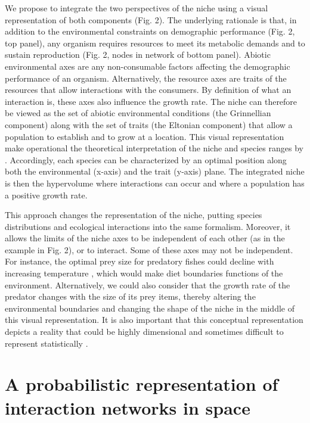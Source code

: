 \documentclass[12pt]{article}
\begin{document}
We propose to integrate the two perspectives of the niche using a visual
representation of both components (Fig. 2). The underlying rationale is that,
in addition to the environmental constraints on demographic performance (Fig. 2,
top panel), any organism requires resources to meet its metabolic demands and
to sustain reproduction (Fig. 2, nodes in network of bottom panel). Abiotic
environmental axes are any non-consumable factors affecting the demographic
performance of an organism. Alternatively, the resource axes are traits of the
resources that allow interactions with the consumers. By definition of what an
interaction is, these axes also influence the growth rate. The niche can
therefore be viewed as the set of abiotic environmental conditions (the
Grinnellian component) along with the set of traits (the Eltonian component)
that allow a population to establish and to grow at a location. This visual
representation make operational the theoretical interpretation of the niche
and species ranges by \citet{Godsoe2017}. Accordingly, each
species can be characterized by an optimal position along both the
environmental (x-axis) and the trait (y-axis) plane. The integrated niche is
then the hypervolume where interactions can occur and where a population has a
positive growth rate.

This approach changes the representation of the niche, putting species
distributions and ecological interactions into the same formalism. Moreover,
it allows the limits of the niche axes to be independent of each other (as in
the example in Fig. 2), or to interact.  Some of these axes may not be
independent. For instance, the optimal prey size for predatory fishes could
decline with increasing temperature \citep{Gibert2014}, which would make diet
boundaries functions of the environment. Alternatively, we could also consider
that the growth rate of the predator changes with the size of its prey items,
thereby altering the environmental boundaries and changing the shape of the
niche in the middle of this visual representation. It is also important that
this conceptual representation depicts a reality that could be highly
dimensional and sometimes difficult to represent statistically
\citep{Clark2007}.

\section*{A probabilistic representation of interaction networks in space}
\end{document}
